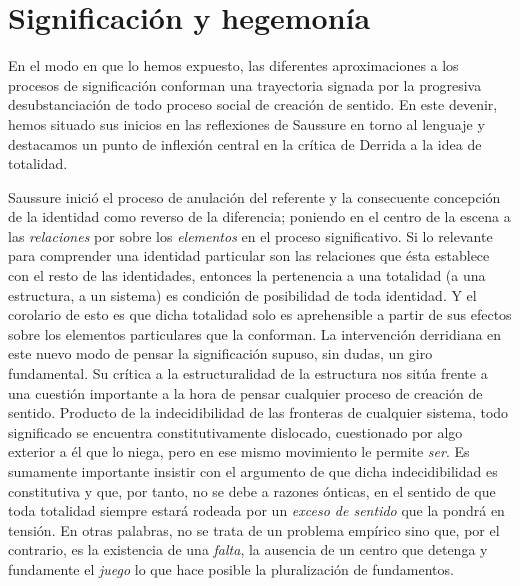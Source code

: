 \documentclass{book}
\begin{document}
\hypertarget{significaciuxf3n-y-hegemonuxeda}{%
\section{Significación y hegemonía}\label{significaciuxf3n-y-hegemonuxeda}}

En el modo en que lo hemos expuesto, las diferentes aproximaciones a los
procesos de significación conforman una trayectoria signada por la
progresiva desubstanciación de todo proceso social de creación de
sentido. En este devenir, hemos situado sus inicios en las reflexiones
de Saussure en torno al lenguaje y destacamos un punto de inflexión
central en la crítica de Derrida a la idea de totalidad.

Saussure inició el proceso de anulación del referente y la consecuente
concepción de la identidad como reverso de la diferencia; poniendo en el
centro de la escena a las \emph{relaciones} por sobre los
\emph{elementos} en el proceso significativo. Si lo relevante para
comprender una identidad particular son las relaciones que ésta
establece con el resto de las identidades, entonces la pertenencia a una
totalidad (a una estructura, a un sistema) es condición de posibilidad
de toda identidad. Y el corolario de esto es que dicha totalidad solo es
aprehensible a partir de sus efectos sobre los elementos particulares
que la conforman. La intervención derridiana en este nuevo modo de
pensar la significación supuso, sin dudas, un giro fundamental. Su
crítica a la estructuralidad de la estructura nos sitúa frente a una
cuestión importante a la hora de pensar cualquier proceso de creación de
sentido. Producto de la indecidibilidad de las fronteras de cualquier
sistema, todo significado se encuentra constitutivamente dislocado,
cuestionado por algo exterior a él que lo niega, pero en ese mismo
movimiento le permite \emph{ser}. Es sumamente importante insistir con
el argumento de que dicha indecidibilidad es constitutiva y que, por
tanto, no se debe a razones ónticas, en el sentido de que toda totalidad
siempre estará rodeada por un \emph{exceso de sentido} que la pondrá en
tensión. En otras palabras, no se trata de un problema empírico sino
que, por el contrario, es la existencia de una \emph{falta}, la ausencia
de un centro que detenga y fundamente el \emph{juego} lo que hace
posible la pluralización de fundamentos.
\end{document}
